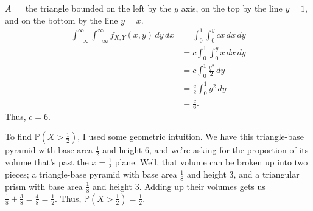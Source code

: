 \documentclass[12pt]{article}
\begin{document}
\newpage
{} $A =$ the triangle bounded on the left by the $y$ axis, on the top by the line $y=1$, and on the bottom by the line $y=x$.
\begin{align*}
    \int_{-\infty}^\infty \int_{-\infty}^\infty f_{X,Y}(x,y)\,dy\,dx &= \int_0^1 \int_0^y cx \,dx \,dy \\
                                                                     &= c\int_0^1 \int_0^y x \,dx \,dy \\
                                                                     &= c\int_0^1 \frac{y^2}2 \,dy \\
                                                                     &= \frac c2 \int_0^1 y^2 \,dy \\
                                                                     &= \frac c6.
\end{align*}
Thus, $c = 6$.

To find $\mathbb P(X > \frac12)$, I used some geometric intuition. We have this triangle-base pyramid with base area $\frac12$ and height 6, and we're asking for the proportion of its volume that's past the $x=\frac12$ plane. Well, that volume can be broken up into two pieces; a triangle-base pyramid with base area $\frac18$ and height 3, and a triangular prism with base area $\frac18$ and height 3. Adding up their volumes gets us $\frac18 + \frac38 = \frac48 = \frac12$. Thus, $\mathbb P(X > \frac12) = \frac12$.
\end{document}
